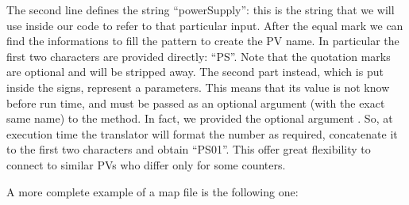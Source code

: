 \documentclass[letterpaper,10pt,english]{sphinxmanual}
\begin{document}
The second line defines the string “powerSupply”: this is the string that we
will use inside our code to refer to that particular input. After the equal mark
we can find the informations to fill the pattern to create the PV name. In
particular the first two characters are provided directly: “PS”. Note that the
quotation marks are optional and will be stripped away. The second part
instead, which is put inside the \sphinxcode{\sphinxupquote{\textless{} \textgreater{}}} signs, represent a parameters. This
means that its value is not know before run time, and must be passed as an
optional argument (with the exact same name) to the {\hyperref[\detokenize{fsm:connect}]{}} method. In
fact, we provided the optional argument . So, at execution time the
translator will format the number as required, concatenate it to the first two
characters and obtain “PS01”. This offer great flexibility to connect to similar
PVs who differ only for some counters.

A more complete example of a map file is the following one:
\end{document}
